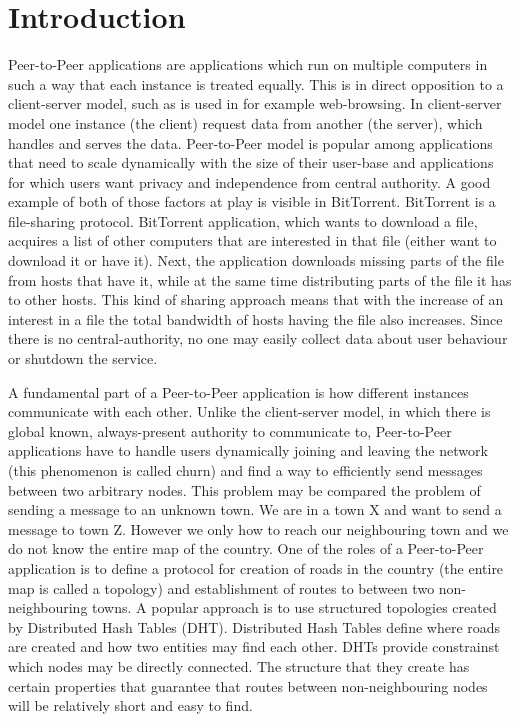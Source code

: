 \chapter{Introduction}

Peer-to-Peer applications are applications which run on multiple computers in
such a way that each instance is treated equally.
This is in direct opposition to a client-server model, such as is used in for
example web-browsing. In client-server model one instance (the client) request
data from another (the server), which handles and serves the data.
Peer-to-Peer model is popular among applications that need to scale dynamically
with the size of their user-base and applications for which users want privacy
and independence from central authority.
A good example of both of those factors at play is visible in BitTorrent.
BitTorrent is a file-sharing protocol.
BitTorrent application, which wants to download a file, acquires a list of other
computers that are interested in that file (either want to download it or have
it).
Next, the application downloads missing parts of the file from hosts that have
it, while at the same time distributing parts of the file it has to other hosts.
This kind of sharing approach means that with the increase of an interest in a
file the total bandwidth of hosts having the file also increases.
Since there is no central-authority, no one may easily collect data about user
behaviour or shutdown the service.

A fundamental part of a Peer-to-Peer application is how different instances
communicate with each other.
Unlike the client-server model, in which there is global known, always-present
authority to communicate to, Peer-to-Peer applications have to handle users
dynamically joining and leaving the network (this phenomenon is called churn)
and find a way to efficiently send messages between two arbitrary nodes.
This problem may be compared the problem of sending a message to an unknown
town.
We are in a town X and want to send a message to town Z.
However we only how to reach our neighbouring town and we do not know the entire
map of the country.
One of the roles of a Peer-to-Peer application is to define a protocol for
creation of roads in the country (the entire map is called a topology) and
establishment of routes to between two non-neighbouring towns.
A popular approach is to use structured topologies created by Distributed Hash
Tables (DHT). 
Distributed Hash Tables define where roads are created and how two entities may
find each other.
DHTs provide constrainst which nodes may be directly connected.
The structure that they create has certain properties that guarantee that routes
between non-neighbouring nodes will be relatively short and easy to find.

